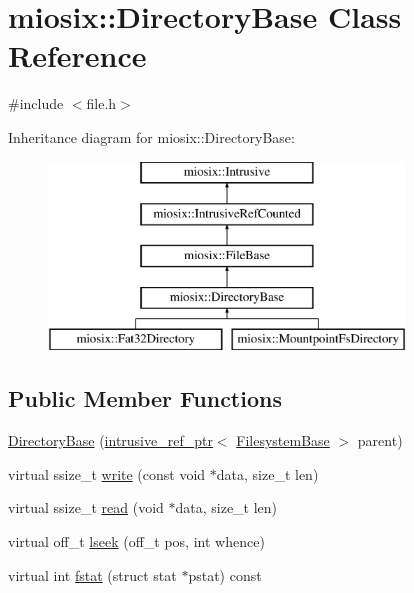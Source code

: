 \hypertarget{classmiosix_1_1_directory_base}{\section{miosix\-:\-:Directory\-Base Class Reference}
\label{classmiosix_1_1_directory_base}
}


{\ttfamily \#include $<$file.\-h$>$}

Inheritance diagram for miosix\-:\-:Directory\-Base\-:\begin{figure}[H]
\begin{center}
\leavevmode
\includegraphics[height=5.000000cm]{classmiosix_1_1_directory_base}
\end{center}
\end{figure}
\subsection*{Public Member Functions}
\begin{DoxyCompactItemize}
\item 
\hyperlink{classmiosix_1_1_directory_base_ad6a63f0d1cb90fd2371873cf1a0db4a6}{Directory\-Base} (\hyperlink{classmiosix_1_1intrusive__ref__ptr}{intrusive\-\_\-ref\-\_\-ptr}$<$ \hyperlink{classmiosix_1_1_filesystem_base}{Filesystem\-Base} $>$ parent)
\item 
virtual ssize\-\_\-t \hyperlink{classmiosix_1_1_directory_base_afa8fdc455f5bb371cccdb0471943ac71}{write} (const void $\ast$data, size\-\_\-t len)
\item 
virtual ssize\-\_\-t \hyperlink{classmiosix_1_1_directory_base_a9f30cc9d0b3d8350c0f547331c565206}{read} (void $\ast$data, size\-\_\-t len)
\item 
virtual off\-\_\-t \hyperlink{classmiosix_1_1_directory_base_a6f4fcb4b41924c76c93ef48272e857b8}{lseek} (off\-\_\-t pos, int whence)
\item 
virtual int \hyperlink{classmiosix_1_1_directory_base_a56bdd2d238298487d7e72bafa72f2dd4}{fstat} (struct stat $\ast$pstat) const 
\end{DoxyCompactItemize}
